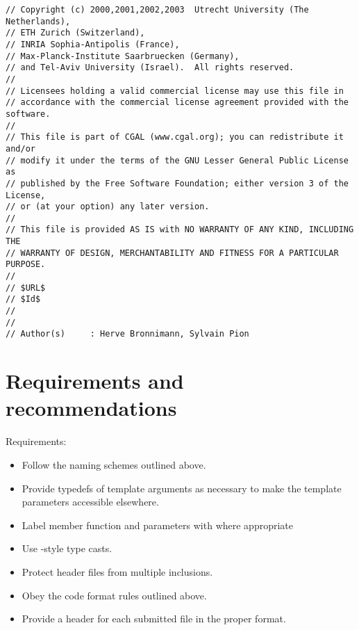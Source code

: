 \begin{verbatim}
// Copyright (c) 2000,2001,2002,2003  Utrecht University (The Netherlands),
// ETH Zurich (Switzerland),
// INRIA Sophia-Antipolis (France),
// Max-Planck-Institute Saarbruecken (Germany),
// and Tel-Aviv University (Israel).  All rights reserved.
//
// Licensees holding a valid commercial license may use this file in
// accordance with the commercial license agreement provided with the software.
//
// This file is part of CGAL (www.cgal.org); you can redistribute it and/or
// modify it under the terms of the GNU Lesser General Public License as
// published by the Free Software Foundation; either version 3 of the License,
// or (at your option) any later version.
//
// This file is provided AS IS with NO WARRANTY OF ANY KIND, INCLUDING THE
// WARRANTY OF DESIGN, MERCHANTABILITY AND FITNESS FOR A PARTICULAR PURPOSE.
//
// $URL$
// $Id$
// 
//
// Author(s)     : Herve Bronnimann, Sylvain Pion
\end{verbatim}


\section{Requirements and recommendations\label{sec:code_format_doc_req_and_rec}}

\noindent
Requirements:
\begin{itemize}
   \item Follow the naming schemes outlined above.
   \item Provide typedefs of template arguments as necessary to make the
         template parameters accessible elsewhere.
   \item Label member function and parameters with  where 
         appropriate
   \item Use \CC-style type casts.
   \item Protect header files from multiple inclusions.
   \item Obey the code format rules outlined above.
   \item Provide a header for each submitted file in the proper format.
\end{itemize}


